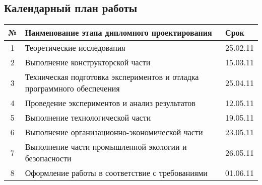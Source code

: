 \subsection{Календарный план работы}

\begin{table}[ht!]
    \begin{tabular}{|c|l|l|}
    \hline
    № & Наименование этапа дипломного проектирования                            & Срок      \\ \hline
    1 & Теоретические исследования                                              & 25.02.11  \\ \hline
    2 & Выполнение конструкторской части                                        & 15.03.11  \\ \hline
    3 & Техническая подготовка экспериментов и отладка программного обеспечения & 25.04.11  \\ \hline
    4 & Проведение экспериментов и анализ результатов                           & 12.05.11  \\ \hline
    5 & Выполнение технологической части                                        & 19.05.11  \\ \hline
    6 & Выполнение организационно-экономической части                           & 23.05.11  \\ \hline
    7 & Выполнение части промышленной экологии и безопасности                   & 26.05.11  \\ \hline
    8 & Оформление работы в соответствие с требованиями                         & 01.06.11  \\ \hline
    \end{tabular}
\end{table}
